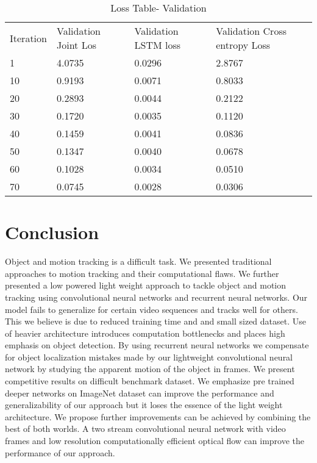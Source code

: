\documentclass[sigconf]{acmart}
\begin{document}
\begin{table}[]
\centering
\caption{Loss Table- Validation}
\label{table2}
\begin{tabular}{llll}
Iteration & Validation Joint Los & Validation LSTM loss & Validation Cross entropy Loss \\
1         & 4.0735               & 0.0296               & 2.8767                        \\
10        & 0.9193               & 0.0071               & 0.8033                        \\
20        & 0.2893               & 0.0044               & 0.2122                        \\
30        & 0.1720               & 0.0035               & 0.1120                        \\
40        & 0.1459               & 0.0041               & 0.0836                        \\
50        & 0.1347               & 0.0040               & 0.0678                        \\
60        & 0.1028               & 0.0034               & 0.0510                        \\
70        & 0.0745               & 0.0028               & 0.0306                       
\end{tabular}
\end{table}


\section{Conclusion} \label{conclusion}

Object and motion tracking is a difficult task. We presented traditional approaches to motion tracking and their computational flaws. We further presented a low powered light weight approach to tackle object and motion tracking using convolutional neural networks and recurrent neural networks. Our model fails to generalize for certain video sequences and tracks well for others. This we believe is due to reduced training time and and small sized dataset. Use of heavier architecture introduces computation bottlenecks and places high emphasis on object detection. By using recurrent neural networks we compensate for object localization mistakes made by our lightweight convolutional neural network by studying the apparent motion of the object in frames. We present competitive results on difficult benchmark dataset. We emphasize pre trained deeper networks on ImageNet dataset can improve the performance and generalizability of our approach but it loses the essence of the light weight architecture. We propose further improvements can be achieved by combining the best of both worlds. A two stream convolutional neural network with video frames and low resolution computationally efficient optical flow can improve the performance of our approach. 



 
\end{document}
